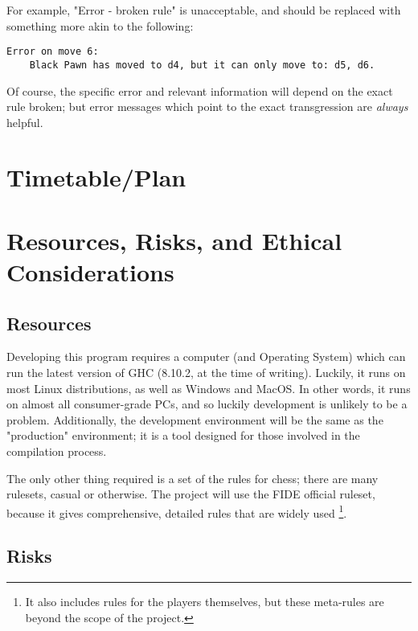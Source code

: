\documentclass[12pt, a4paper]{scrartcl}
\begin{document}
For example, "Error - broken rule" is unacceptable, and should be replaced with something more akin to the following:

\begin{lstlisting}
Error on move 6:
    Black Pawn has moved to d4, but it can only move to: d5, d6.
\end{lstlisting}

Of course, the specific error and relevant information will depend on the exact rule broken; but error messages which point to the exact transgression are \emph{always} helpful.

\section{Timetable/Plan}


\section{Resources, Risks, and Ethical Considerations}

\subsection{Resources}

Developing this program requires a computer (and Operating System) which can run the latest version of GHC (8.10.2, at the time of writing). Luckily, it runs on most Linux distributions, as well as Windows and MacOS. In other words, it runs on almost all consumer-grade PCs, and so luckily development is unlikely to be a problem. Additionally, the development environment will be the same as the "production" environment; it is a tool designed for those involved in the compilation process.

The only other thing required is a set of the rules for chess; there are many rulesets, casual or otherwise. The project will use the FIDE official ruleset, because it gives comprehensive, detailed rules that are widely used \footnote{It also includes rules for the players themselves, but these meta-rules are beyond the scope of the project.}.

\subsection{Risks}
\end{document}
